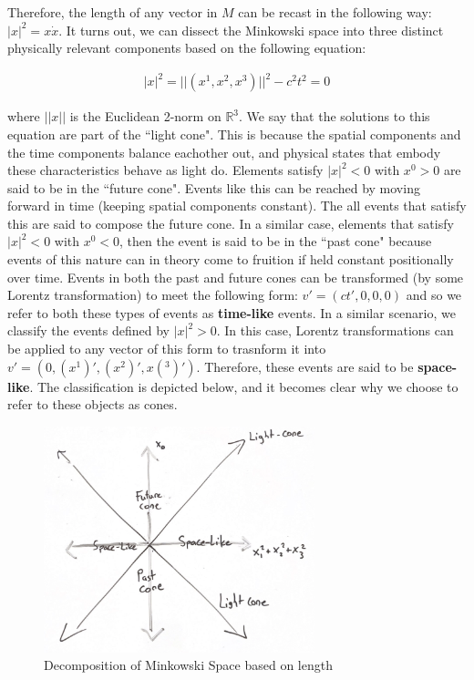 \documentclass[10pt]{ucthesis}
\newcommand{\R}{\mathbb{R}}
\begin{document}
Therefore, the length of any vector in $M$ can be recast in the following way: $|x|^2 = x\dot x$. It turns out, we can dissect the Minkowski space into three distinct physically relevant components based on the following equation:

\begin{equation}
\begin{aligned}
	|x|^2 = ||(x^1,x^2,x^3)||^2 - c^2t^2= 0 
\end{aligned}
\end{equation}

\noindent where $||x||$ is the Euclidean 2-norm on $\R^3$. We say that the solutions to this equation are part of the ``light cone". This is because the spatial components and the time components balance eachother out, and physical states that embody these characteristics behave as light do. Elements satisfy $|x|^2 < 0$ with $x^0>0$ are said to be  in the ``future cone". Events like this can be reached by moving forward in time (keeping spatial components constant). The all events that satisfy this are said to compose the future cone. In a similar case, elements that satisfy $|x|^2 < 0$ with $x^0<0$, then the event is said to be in the ``past cone" because events of this nature can in theory come to fruition if held constant positionally over time. Events in both the past and future cones can be transformed (by some Lorentz transformation) to meet the following form: $v' = (ct',0,0,0)$ and so we refer to both these types of events as \textbf{time-like} events. In a similar scenario, we classify the events defined by $|x|^2 >0$. In this case, Lorentz transformations can be applied to any vector of this form to trasnform it into $v' = (0,(x^1)',(x^2)',x(^3)')$. Therefore, these events are said to be \textbf{space-like}. The classification is depicted below, and it becomes clear why we choose to refer to these objects as cones.

\begin{figure}[H]
	\centering
	\includegraphics[width=0.7\textwidth]{Light cone-1}
	\caption{Decomposition of Minkowski Space based on length}
\end{figure}
\end{document}
